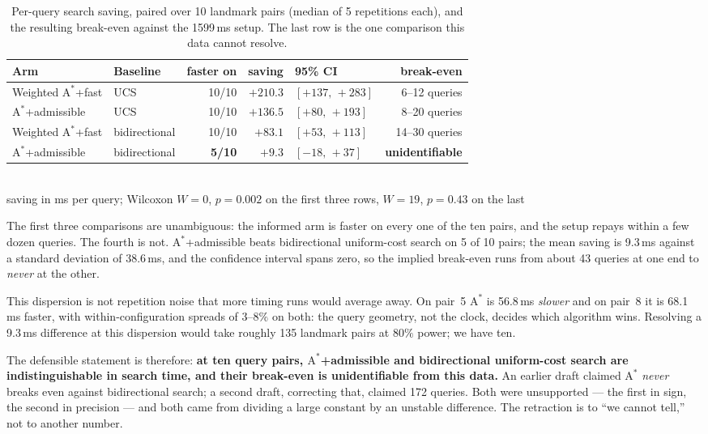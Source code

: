 \documentclass[11pt]{article}
\begin{document}
\begin{table}[t]
\centering
\small
\caption{Per-query search saving, paired over 10 landmark pairs (median of 5 repetitions each), and
the resulting break-even against the 1599\,ms setup. The last row is the one comparison this data
cannot resolve.}
\label{tab:breakeven}
\setlength{\tabcolsep}{5pt}
\begin{tabular}{@{}llrrlr@{}}
\toprule
\textbf{Arm} & \textbf{Baseline} & \textbf{faster on} & \textbf{saving} &
\textbf{95\% CI} & \textbf{break-even} \\
\midrule
Weighted $\mathrm{A}^*$+fast & UCS           & 10/10 & $+210.3$ & $[+137,\,+283]$ & 6--12 queries \\
$\mathrm{A}^*$+admissible    & UCS           & 10/10 & $+136.5$ & $[+80,\,+193]$  & 8--20 queries \\
Weighted $\mathrm{A}^*$+fast & bidirectional & 10/10 & $+83.1$  & $[+53,\,+113]$  & 14--30 queries \\
\midrule
$\mathrm{A}^*$+admissible    & bidirectional & \textbf{5/10} & $+9.3$ & $[-18,\,+37]$ &
\textbf{unidentifiable} \\
\bottomrule
\end{tabular}
\\[2pt]
\footnotesize saving in ms per query; Wilcoxon $W = 0$, $p = 0.002$ on the first three rows,
$W = 19$, $p = 0.43$ on the last
\end{table}

The first three comparisons are unambiguous: the informed arm is faster on every one of the ten
pairs, and the setup repays within a few dozen queries. The fourth is not.
$\mathrm{A}^*$+admissible beats bidirectional uniform-cost search on 5 of 10 pairs; the mean saving
is 9.3\,ms against a standard deviation of 38.6\,ms, and the confidence interval spans zero, so the
implied break-even runs from about 43 queries at one end to \emph{never} at the other.

This dispersion is not repetition noise that more timing runs would average away. On pair~5
$\mathrm{A}^*$ is 56.8\,ms \emph{slower} and on pair~8 it is 68.1\,ms faster, with
within-configuration spreads of $3$--$8\%$ on both: the query geometry, not the clock, decides which
algorithm wins. Resolving a 9.3\,ms difference at this dispersion would take roughly 135 landmark
pairs at $80\%$ power; we have ten.

The defensible statement is therefore: \textbf{at ten query pairs, $\mathrm{A}^*$+admissible and
bidirectional uniform-cost search are indistinguishable in search time, and their break-even is
unidentifiable from this data.} An earlier draft claimed $\mathrm{A}^*$ \emph{never} breaks even
against bidirectional search; a second draft, correcting that, claimed 172 queries. Both were
unsupported --- the first in sign, the second in precision --- and both came from dividing a large
constant by an unstable difference. The retraction is to ``we cannot tell,'' not to another number.
\end{document}
